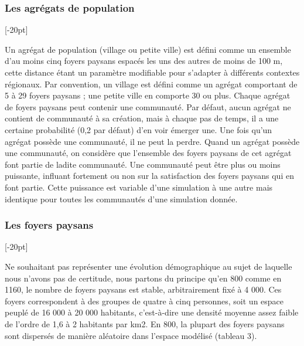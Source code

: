 \subsubsection{Les agrégats de population}[-20pt]

Un agrégat de population (village ou petite ville) est défini comme un ensemble d'au moins cinq foyers paysans espacés les uns des autres de moins de 100 m, cette distance étant un paramètre modifiable pour s'adapter à différents contextes régionaux.
Par convention, un village est défini comme un agrégat comportant de 5 à 29 foyers paysans ; une petite ville en comporte 30 ou plus.
Chaque agrégat de foyers paysans peut contenir une communauté.
Par défaut, aucun agrégat ne contient de communauté à sa création, mais à chaque pas de temps, il a une certaine probabilité (0,2 par défaut) d'en voir émerger une.
Une fois qu'un agrégat possède une communauté, il ne peut la perdre.
Quand un agrégat possède une communauté, on considère que l'ensemble des foyers paysans de cet agrégat font partie de ladite communauté.
Une communauté peut être plus ou moins puissante, influant fortement ou non sur la satisfaction des foyers paysans qui en font partie.
Cette puissance est variable d'une simulation à une autre mais identique pour toutes les communautés d'une simulation donnée.


\subsubsection{Les foyers paysans}[-20pt]

Ne souhaitant pas représenter une évolution démographique au sujet de laquelle nous n'avons pas de certitude, nous partons du principe qu'en 800 comme en 1160, le nombre de foyers paysans est stable, arbitrairement fixé à 4 000.
Ces foyers correspondent à des groupes de quatre à cinq personnes, soit un espace peuplé de 16 000 à 20 000 habitants, c'est-à-dire une densité moyenne assez faible de l'ordre de 1,6 à 2 habitants par km2.
En 800, la plupart des foyers paysans sont dispersés de manière aléatoire dans l'espace modélisé (tableau 3).

